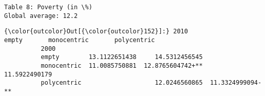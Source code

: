 \documentclass{article}
\begin{document}
    \begin{Verbatim}[commandchars=\\\{\}]
Table 8: Poverty (in \%)
Global average: 12.2
    \end{Verbatim}

            \begin{Verbatim}[commandchars=\\\{\}]
{\color{outcolor}Out[{\color{outcolor}152}]:} 2010                 empty       monocentric       polycentric
          2000                                                          
          empty        13.1122651438     14.5312456545                  
          monocentric  11.0085750881  12.8765604742+**     11.5922490179
          polycentric                    12.0246560865  11.3324999094-**
\end{Verbatim}
        

    
    
    
    
\end{document}

